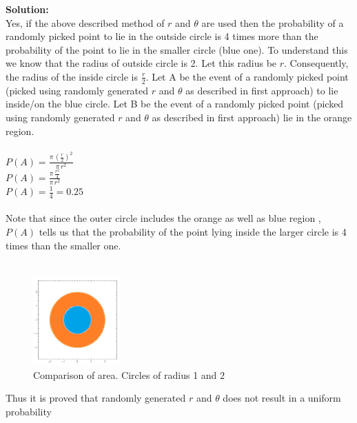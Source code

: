 \documentclass[answers]{exam}
\begin{document}
\begin{framed}
    \textbf{Solution:}\\
    Yes, if the above described method of $r$ and $\theta$ are used then the probability of a randomly picked point to lie in the outside circle is 4 times more than the probability of the point to lie in the smaller circle (blue one). To understand this we know that the radius of outside circle is 2. Let this radius be $r$. Consequently, the radius of the inside circle is $\frac{r}{2}$. Let A be the event of a randomly picked point (picked using randomly generated $r$ and $\theta$ as described in first approach) to lie inside/on the blue circle. Let B be the event of a randomly picked point (picked using randomly generated $r$ and $\theta$ as described in first approach) lie in the orange region.\\ \\
    $P(A) = \frac{\pi \, (\frac{r}{2})^2}{\pi \, r^2}$\\
    $P(A) = \frac{\pi \, \frac{r^2}{4}}{ \pi \, r^2}$\\
    $P(A) = \frac{1}{4} = 0.25$\\\\
    Note that since the outer circle includes the orange as well as blue region , $P(A)$ tells us that the probability of the point lying inside the larger circle is 4 times than the smaller one.\\\\

    \begin{figure}[H] %
        \centering
        \includegraphics[width= 0.3\textwidth]{Q3.3_question_modified.png}
        \caption{Comparison of area. Circles of radius 1 and 2}
    \end{figure}

    Thus it is proved that randomly generated $r$ and $\theta$ does not result in a uniform probability \\ 
    

\end{framed}
\end{document}
